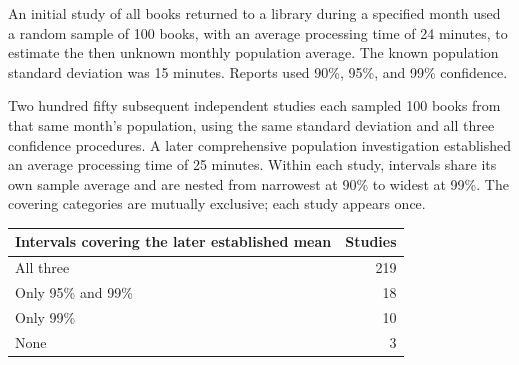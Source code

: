 \noindent\begin{minipage}[t]{0.70\linewidth}
\vspace{0pt}
An initial study of all books returned to a library during a specified month used a random sample of 100 books, with an average processing time of 24 minutes, to estimate the then unknown monthly population average. The known population standard deviation was 15 minutes. Reports used 90\%, 95\%, and 99\% confidence.

Two hundred fifty subsequent independent studies each sampled 100 books from that same month's population, using the same standard deviation and all three confidence procedures. A later comprehensive population investigation established an average processing time of 25 minutes. Within each study, intervals share its own sample average and are nested from narrowest at 90\% to widest at 99\%. The covering categories are mutually exclusive; each study appears once.
\end{minipage}\hfill
\begin{minipage}[t]{0.28\linewidth}
\vspace{0pt}
\centering
\small
\setlength{\tabcolsep}{4pt}
\begin{tabularx}{\linewidth}{@{}>{\raggedright\arraybackslash}Xr@{}}\toprule
Intervals covering the later established mean & Studies\\\midrule
All three & 219\\
Only 95\% and 99\% & 18\\
Only 99\% & 10\\
None & 3\\
\bottomrule\end{tabularx}
\end{minipage}\par


